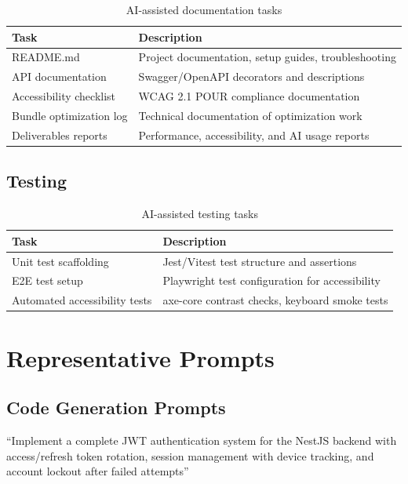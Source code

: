 \documentclass[12pt,a4paper]{article}
\begin{document}
\begin{table}[H]
\centering
\begin{tabularx}{\textwidth}{lX}
\toprule
\textbf{Task} & \textbf{Description} \\
\midrule
README.md                 & Project documentation, setup guides, troubleshooting \\
API documentation         & Swagger/OpenAPI decorators and descriptions \\
Accessibility checklist   & WCAG 2.1 POUR compliance documentation \\
Bundle optimization log   & Technical documentation of optimization work \\
Deliverables reports      & Performance, accessibility, and AI usage reports \\
\bottomrule
\end{tabularx}
\caption{AI-assisted documentation tasks}
\end{table}

\subsection{Testing}

\begin{table}[H]
\centering
\begin{tabularx}{\textwidth}{lX}
\toprule
\textbf{Task} & \textbf{Description} \\
\midrule
Unit test scaffolding          & Jest/Vitest test structure and assertions \\
E2E test setup                 & Playwright test configuration for accessibility \\
Automated accessibility tests  & axe-core contrast checks, keyboard smoke tests \\
\bottomrule
\end{tabularx}
\caption{AI-assisted testing tasks}
\end{table}

\section{Representative Prompts}

\subsection{Code Generation Prompts}

\begin{promptbox}
``Implement a complete JWT authentication system for the NestJS backend with access/refresh token rotation, session management with device tracking, and account lockout after failed attempts''
\end{promptbox}
\end{document}

